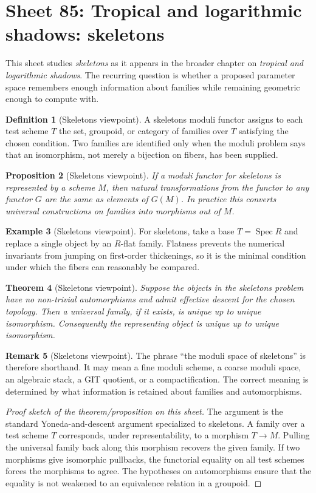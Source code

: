 \documentclass[11pt]{amsart}
\newtheorem{theorem}{Theorem}[section]
\newtheorem{proposition}[theorem]{Proposition}
\theoremstyle{definition}
\newtheorem{definition}[theorem]{Definition}
\newtheorem{example}[theorem]{Example}
\newtheorem{remark}[theorem]{Remark}
\newcommand{\Spec}{\operatorname{Spec}}
\begin{document}
\section{Sheet 85: Tropical and logarithmic shadows: skeletons}
This sheet studies \emph{skeletons} as it appears in the broader chapter on \emph{tropical and logarithmic shadows}.  The recurring question is whether a proposed parameter space remembers enough information about families while remaining geometric enough to compute with.
\begin{definition}[Skeletons viewpoint]
A skeletons moduli functor assigns to each test scheme $T$ the set, groupoid, or category of families over $T$ satisfying the chosen condition.  Two families are identified only when the moduli problem says that an isomorphism, not merely a bijection on fibers, has been supplied.
\end{definition}
\begin{proposition}[Skeletons viewpoint]
If a moduli functor for skeletons is represented by a scheme $M$, then natural transformations from the functor to any functor $G$ are the same as elements of $G(M)$.  In practice this converts universal constructions on families into morphisms out of $M$.
\end{proposition}
\begin{example}[Skeletons viewpoint]
For skeletons, take a base $T=\Spec R$ and replace a single object by an $R$-flat family.  Flatness prevents the numerical invariants from jumping on first-order thickenings, so it is the minimal condition under which the fibers can reasonably be compared.
\end{example}
\begin{theorem}[Skeletons viewpoint]
Suppose the objects in the skeletons problem have no non-trivial automorphisms and admit effective descent for the chosen topology.  Then a universal family, if it exists, is unique up to unique isomorphism.  Consequently the representing object is unique up to unique isomorphism.
\end{theorem}
\begin{remark}[Skeletons viewpoint]
The phrase ``the moduli space of skeletons'' is therefore shorthand.  It may mean a fine moduli scheme, a coarse moduli space, an algebraic stack, a GIT quotient, or a compactification.  The correct meaning is determined by what information is retained about families and automorphisms.
\end{remark}
\begin{proof}[Proof sketch of the theorem/proposition on this sheet]
The argument is the standard Yoneda-and-descent argument specialized to skeletons.  A family over a test scheme $T$ corresponds, under representability, to a morphism $T\to M$.  Pulling the universal family back along this morphism recovers the given family.  If two morphisms give isomorphic pullbacks, the functorial equality on all test schemes forces the morphisms to agree.  The hypotheses on automorphisms ensure that the equality is not weakened to an equivalence relation in a groupoid.
\end{proof}
\end{document}
